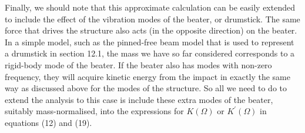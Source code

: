   Finally, we should note that this approximate calculation can be easily 
  extended to include the effect of the vibration modes of the beater, or 
  drumstick. The same force that drives the structure also acts (in the 
  opposite direction) on the beater. In a simple model, such as the pinned-free 
  beam model that is used to represent a drumstick in section 12.1, the mass we 
  have so far considered corresponds to a rigid-body mode of the beater. If the 
  beater also has modes with non-zero frequency, they will acquire kinetic 
  energy from the impact in exactly the same way as discussed above for the 
  modes of the structure. So all we need to do to extend the analysis to this 
  case is include these extra modes of the beater, suitably mass-normalised, 
  into the expressions for $K(\Omega)$ or $K^\prime (\Omega)$ in equations (12) 
  and (19). 